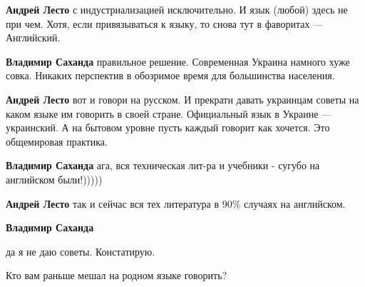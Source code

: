 \begin{itemize}
\begin{itemize}
\textbf{Андрей Лесто} с индустриализацией исключительно. И язык (любой) здесь не при чем. Хотя, если привязываться к языку, то снова тут в фаворитах — Английский.

 
\textbf{Владимир Саханда} правильное решение. Современная Украина намного хуже совка. Никаких перспектив в обозримое время для большинства населения.

 
\textbf{Андрей Лесто} вот и говори на русском. И прекрати давать украинцам советы на каком языке им говорить в своей стране. Официальный язык в Украине — украинский. А на бытовом уровне пусть каждый говорит как хочется. Это общемировая практика.

 
\textbf{Владимир Саханда} ага, вся техническая лит-ра и учебники - сугубо на английском были!)))))

 
\textbf{Андрей Лесто} так и сейчас вся тех литература в 90\% случаях на английском.

 
\textbf{Владимир Саханда} 

да я не даю советы. Констатирую.

Кто вам раньше мешал на родном языке говорить?


\end{itemize}
\end{itemize}
